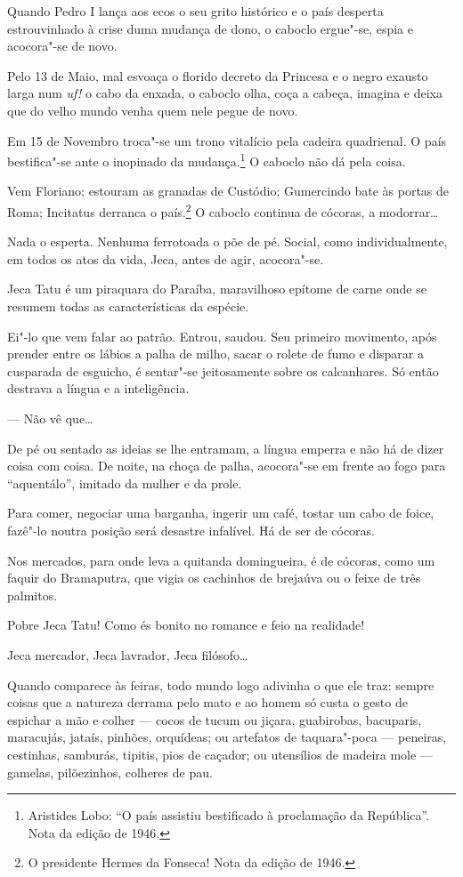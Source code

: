 Quando Pedro I lança aos ecos o seu grito histórico e o país desperta
estrouvinhado à crise duma mudança de dono, o caboclo ergue"-se, espia e
acocora"-se de novo.

Pelo 13 de Maio, mal esvoaça o florido decreto da Princesa e o negro
exausto larga num \emph{uf!} o cabo da enxada, o caboclo olha, coça a
cabeça, imagina e deixa que do velho mundo venha quem nele pegue de
novo.

Em 15 de Novembro troca"-se um trono vitalício pela cadeira quadrienal. O
país bestifica"-se ante o inopinado da mudança.\footnote{Aristides Lobo:
  ``O país assistiu bestificado à proclamação da República''. Nota da
  edição de 1946.} O caboclo não dá pela coisa.

Vem Floriano; estouram as granadas de Custódio; Gumercindo bate às
portas de Roma; Incitatus derranca o país.\footnote{O presidente Hermes
  da Fonseca! Nota da edição de 1946.} O caboclo continua de cócoras, a
modorrar\ldots{}

Nada o esperta. Nenhuma ferrotoada o põe de pé. Social, como
individualmente, em todos os atos da vida, Jeca, antes de agir,
acocora"-se.

Jeca Tatu é um piraquara do Paraíba, maravilhoso epítome de carne onde
se resumem todas as características da espécie.

Ei"-lo que vem falar ao patrão. Entrou, saudou. Seu primeiro movimento,
após prender entre os lábios a palha de milho, sacar o rolete de fumo e
disparar a cusparada de esguicho, é sentar"-se jeitosamente sobre os
calcanhares. Só então destrava a língua e a inteligência.

--- Não vê que\ldots{}

De pé ou sentado as ideias se lhe entramam, a língua emperra e não há de
dizer coisa com coisa. De noite, na choça de palha, acocora"-se em frente
ao fogo para ``aquentálo'', imitado da mulher e da prole.

Para comer, negociar uma barganha, ingerir um café, tostar um cabo de
foice, fazê"-lo noutra posição será desastre infalível. Há de ser de
cócoras.

Nos mercados, para onde leva a quitanda domingueira, é de cócoras, como
um faquir do Bramaputra, que vigia os cachinhos de brejaúva ou o feixe
de três palmitos.

Pobre Jeca Tatu! Como és bonito no romance e feio na realidade!

Jeca mercador, Jeca lavrador, Jeca filósofo\ldots{}

Quando comparece às feiras, todo mundo logo adivinha o que ele traz:
sempre coisas que a natureza derrama pelo mato e ao homem só custa o
gesto de espichar a mão e colher --- cocos de tucum ou jiçara,
guabirobas, bacuparis, maracujás, jataís, pinhões, orquídeas; ou
artefatos de taquara"-poca --- peneiras, cestinhas, samburás, tipitis,
pios de caçador; ou utensílios de madeira mole --- gamelas, pilõezinhos,
colheres de pau.

